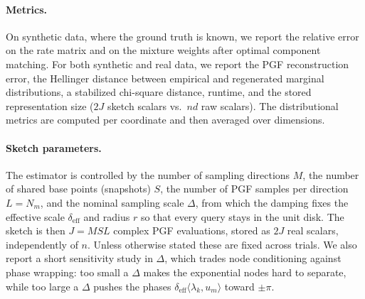 \documentclass[sigconf,natbib=true,anonymous=true,review=true]{acmart}
\newcommand{\deff}{\delta_{\mathrm{eff}}}
\begin{document}
\paragraph{Metrics.}
On synthetic data, where the ground truth is known, we report the relative error on the rate matrix and on the mixture weights after optimal component matching. 
For both synthetic and real data, we report the PGF reconstruction error, the Hellinger distance between empirical and regenerated marginal distributions, a stabilized chi-square distance, runtime, and the stored representation size ($2J$ sketch scalars vs.\ $nd$ raw scalars).
The distributional metrics are computed per coordinate and then averaged over dimensions.

\paragraph{Sketch parameters.}
The estimator is controlled by the number of sampling directions $M$, the number of
shared base points (snapshots) $S$, the number of PGF samples per direction $L=N_m$,
and the nominal sampling scale $\Delta$, from which the damping fixes the effective
scale $\deff$ and radius $r$ so that every query stays in the unit disk. The sketch is
then $J=MSL$ complex PGF evaluations, stored as $2J$ real scalars, independently of $n$.
Unless otherwise stated these are fixed across trials. We also report a short
sensitivity study in $\Delta$, which trades node conditioning against phase wrapping:
too small a $\Delta$ makes the exponential nodes hard to separate, while too large a
$\Delta$ pushes the phases $\deff\langle\lambda_k,u_m\rangle$ toward $\pm\pi$.
\end{document}
